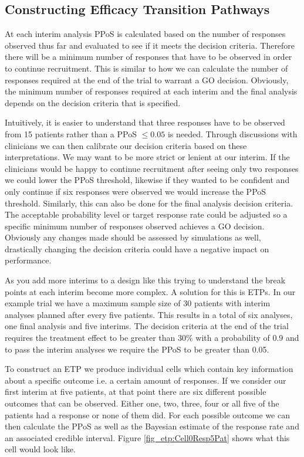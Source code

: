 \subsection{Constructing Efficacy Transition Pathways} 
\label{etp:conETPs}

At each interim analysis PPoS is calculated based on the number of responses observed thus far and evaluated to see if it meets the decision criteria. Therefore there will be a minimum number of responses that have to be observed in order to continue recruitment. This is similar to how we can calculate the number of responses required at the end of the trial to warrant a GO decision. Obviously, the minimum number of responses required at each interim and the final analysis depends on the decision criteria that is specified. 

Intuitively, it is easier to understand that three responses have to be observed from 15 patients rather than a PPoS $\leq 0.05$ is needed. Through discussions with clinicians we can then calibrate our decision criteria based on these interpretations. We may want to be more strict or lenient at our interim. If the clinicians would be happy to continue recruitment after seeing only two responses we could lower the PPoS threshold, likewise if they wanted to be confident and only continue if six responses were observed we would increase the PPoS threshold. Similarly, this can also be done for the final analysis decision criteria. The acceptable probability level or target response rate could be adjusted so a specific minimum number of responses observed achieves a GO decision. Obviously any changes made should be assessed by simulations as well, drastically changing the decision criteria could have a negative impact on performance. 
 
As you add more interims to a design like this trying to understand the break points at each interim become more complex. A solution for this is ETPs. In our example trial we have a maximum sample size of 30 patients with interim analyses planned after every five patients. This results in a total of six analyses, one final analysis and five interims. The decision criteria at the end of the trial requires the treatment effect to be greater than 30\% with a probability of 0.9 and to pass the interim analyses we require the PPoS to be greater than 0.05. 

To construct an ETP we produce individual cells which contain key information about a specific outcome i.e. a certain amount of responses. If we consider our first interim at five patients, at that point there are six different possible outcomes that can be observed. Either one, two, three, four or all five of the patients had a response or none of them did. For each possible outcome we can then calculate the PPoS as well as the Bayesian estimate of the response rate and an associated credible interval. Figure \ref{fig_etp:Cell0Resp5Pat} shows what this cell would look like. 

